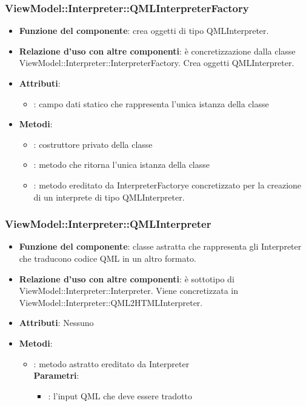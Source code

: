 \subsubsection{ViewModel::Interpreter::QMLInterpreterFactory}
\begin{itemize}
\item\textbf{Funzione del componente}: crea oggetti di tipo QMLInterpreter.
	\item\textbf{Relazione d'uso con altre componenti}: è concretizzazione dalla classe ViewModel::Interpreter::InterpreterFactory. Crea oggetti QMLInterpreter.\\
\item\textbf{Attributi}:
	\begin{itemize}
		\item{}: campo dati statico che rappresenta l'unica istanza della classe\\
	\end{itemize}
\item\textbf{Metodi}:
	\begin{itemize}
		\item{}: costruttore privato della classe\\
		\item{}: metodo che ritorna l'unica istanza della classe\\
		\item{}: metodo ereditato da InterpreterFactorye concretizzato per la creazione di un interprete di tipo QMLInterpreter.\\
	\end{itemize}
\end{itemize}

\subsubsection{ViewModel::Interpreter::QMLInterpreter}
\begin{itemize}
\item\textbf{Funzione del componente}: classe astratta che rappresenta gli Interpreter che traducono codice QML in un altro formato.
	\item\textbf{Relazione d'uso con altre componenti}: è sottotipo di ViewModel::Interpreter::Interpreter. Viene concretizzata in ViewModel::Interpreter::QML2HTMLInterpreter.\\ 
\item\textbf{Attributi}: Nessuno
\item\textbf{Metodi}:
	\begin{itemize}
		\item{}: metodo astratto ereditato da Interpreter\\
		\textbf{Parametri}:
			\begin{itemize}
				\item{}: l'input QML che deve essere tradotto \\
			\end{itemize}
	\end{itemize}
\end{itemize}

